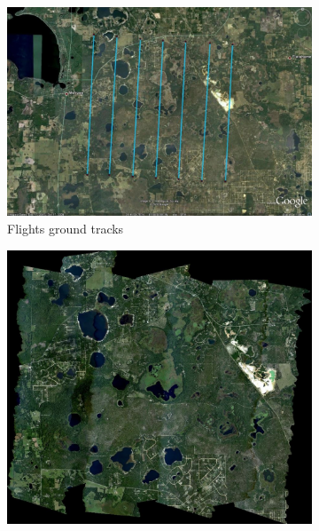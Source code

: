 \documentclass[remotesensing,article,accept,moreauthors,pdftex,12pt,a4paper]{mdpi}
\begin{document}
\begin{figure}[t]
    \centering
    \begin{subfigure}[b]{0.3\textwidth}
        \centering
        \includegraphics[width=\textwidth]{./images/JPL_AVIRIS_flight_ground_tracks_OSBS_9_4_10.png}
        \caption{Flights ground tracks}
        \label{fig:JPL_AVIRIS_flight_ground_tracks_OSBS_9_4_10}
    \end{subfigure}
    \hfill
    \begin{subfigure}[b]{0.3\textwidth}
        \centering
        \includegraphics[width=\textwidth]{./images/JPL_AVIRIS_true_color_mosaic_OSBS_9_4_10.png}

\end{subfigure}
\end{figure}
\end{document}
